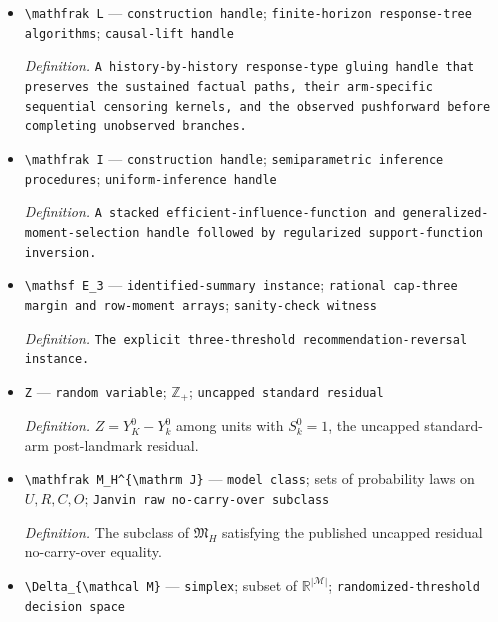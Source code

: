\documentclass{article}
\begin{document}
\begin{itemize}
  \item \texttt{\textbackslash{}\allowbreak{}mathfrak L} --- \texttt{construction handle}; \texttt{finite-\allowbreak{}horizon response-\allowbreak{}tree algorithms}; \texttt{causal-\allowbreak{}lift handle}
  \par\smallskip\noindent\emph{Definition.} \texttt{A history-\allowbreak{}by-\allowbreak{}history response-\allowbreak{}type gluing handle that preserves the sustained factual paths,\allowbreak{} their arm-\allowbreak{}specific sequential censoring kernels,\allowbreak{} and the observed pushforward before completing unobserved branches.}
  \item \texttt{\textbackslash{}\allowbreak{}mathfrak I} --- \texttt{construction handle}; \texttt{semiparametric inference procedures}; \texttt{uniform-\allowbreak{}inference handle}
  \par\smallskip\noindent\emph{Definition.} \texttt{A stacked efficient-\allowbreak{}influence-\allowbreak{}function and generalized-\allowbreak{}moment-\allowbreak{}selection handle followed by regularized support-\allowbreak{}function inversion.}
  \item \texttt{\textbackslash{}\allowbreak{}mathsf E\_\allowbreak{}3} --- \texttt{identified-\allowbreak{}summary instance}; \texttt{rational cap-\allowbreak{}three margin and row-\allowbreak{}moment arrays}; \texttt{sanity-\allowbreak{}check witness}
  \par\smallskip\noindent\emph{Definition.} \texttt{The explicit three-\allowbreak{}threshold recommendation-\allowbreak{}reversal instance.}
  \item \texttt{Z} --- \texttt{random variable}; \(\mathbb Z_+\); \texttt{uncapped standard residual}
  \par\smallskip\noindent\emph{Definition.} \(Z=Y_K^0-Y_k^0\) among units with \(S_k^0=1\), the uncapped standard-arm post-landmark residual.
  \item \texttt{\textbackslash{}\allowbreak{}mathfrak M\_\allowbreak{}H\textasciicircum{}\{\textbackslash{}\allowbreak{}mathrm J\}\allowbreak{}} --- \texttt{model class}; sets of probability laws on \(U,R,C,O\); \texttt{Janvin raw no-\allowbreak{}carry-\allowbreak{}over subclass}
  \par\smallskip\noindent\emph{Definition.} The subclass of \(\mathfrak M_H\) satisfying the published uncapped residual no-carry-over equality.
  \item \texttt{\textbackslash{}\allowbreak{}Delta\_\allowbreak{}\{\textbackslash{}\allowbreak{}mathcal M\}\allowbreak{}} --- \texttt{simplex}; subset of \(\mathbb R^{|\mathcal M|}\); \texttt{randomized-\allowbreak{}threshold decision space}

\end{itemize}
\end{document}
